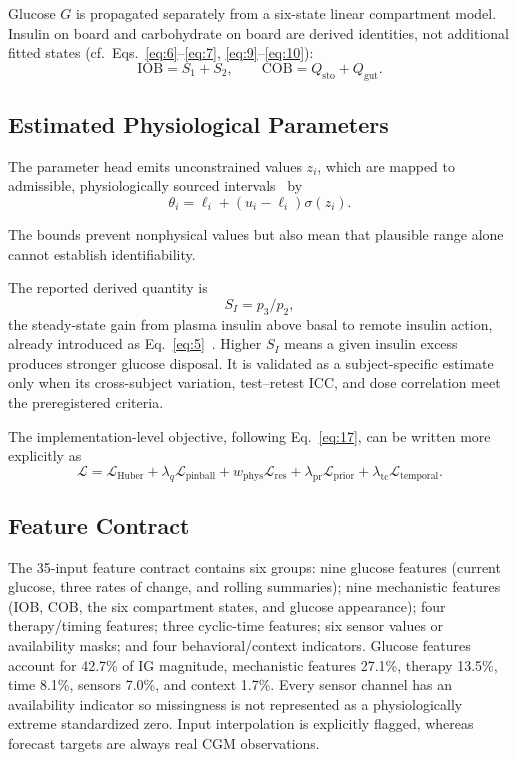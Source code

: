 \documentclass[journal]{IEEEtran}
\begin{document}
Glucose $G$ is propagated separately from a six-state linear compartment model. Insulin on board and carbohydrate on board are derived identities, not additional fitted states (cf.\ Eqs.~\eqref{eq:6}--\eqref{eq:7}, \eqref{eq:9}--\eqref{eq:10}):
\begin{equation}
\text{IOB} = S_1 + S_2, \qquad \text{COB} = Q_{\text{sto}} + Q_{\text{gut}}.
\label{eq:19}
\end{equation}

\subsection{Estimated Physiological Parameters}

The parameter head emits unconstrained values $z_i$, which are mapped to admissible, physiologically sourced intervals~\cite{ref33} by
\begin{equation}
\theta_i = \ell_i + (u_i - \ell_i)\sigma(z_i).
\label{eq:20}
\end{equation}

The bounds prevent nonphysical values but also mean that plausible range alone cannot establish identifiability.

The reported derived quantity is
\begin{equation}
S_I = p_3/p_2,
\label{eq:21}
\end{equation}
the steady-state gain from plasma insulin above basal to remote insulin action, already introduced as Eq.~\eqref{eq:5}~\cite{ref1,ref32}. Higher $S_I$ means a given insulin excess produces stronger glucose disposal. It is validated as a subject-specific estimate only when its cross-subject variation, test--retest ICC, and dose correlation meet the preregistered criteria.

The implementation-level objective, following Eq.~\eqref{eq:17}, can be written more explicitly as
\begin{equation}
\mathcal{L} = \mathcal{L}_{\text{Huber}} + \lambda_q \mathcal{L}_{\text{pinball}} + w_{\text{phys}} \mathcal{L}_{\text{res}} + \lambda_{\text{pr}} \mathcal{L}_{\text{prior}} + \lambda_{\text{tc}} \mathcal{L}_{\text{temporal}}.
\label{eq:22}
\end{equation}

\subsection{Feature Contract}

The 35-input feature contract contains six groups: nine glucose features (current glucose, three rates of change, and rolling summaries); nine mechanistic features (IOB, COB, the six compartment states, and glucose appearance); four therapy/timing features; three cyclic-time features; six sensor values or availability masks; and four behavioral/context indicators. Glucose features account for 42.7\% of IG magnitude, mechanistic features 27.1\%, therapy 13.5\%, time 8.1\%, sensors 7.0\%, and context 1.7\%. Every sensor channel has an availability indicator so missingness is not represented as a physiologically extreme standardized zero. Input interpolation is explicitly flagged, whereas forecast targets are always real CGM observations.
\end{document}
